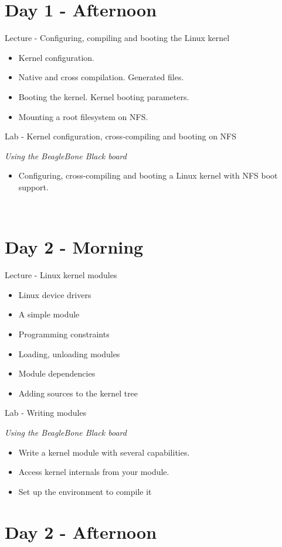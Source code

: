 \documentclass[a4paper,12pt,obeyspaces,spaces,hyphens]{article}
\begin{document}
\section{Day 1 - Afternoon}
\feagendatwocolumn
{Lecture - Configuring, compiling and booting the Linux kernel}
{
  \begin{itemize}
  \item Kernel configuration.
  \item Native and cross compilation. Generated files.
  \item Booting the kernel. Kernel booting parameters.
  \item Mounting a root filesystem on NFS.
  \end{itemize}
}
{Lab - Kernel configuration, cross-compiling and booting on NFS}
{
  {\em Using the BeagleBone Black board}
  \begin{itemize}
  \item Configuring, cross-compiling and booting a Linux kernel with
    NFS boot support.
  \end{itemize}
}
\\
\section{Day 2 - Morning}

\feagendatwocolumn
{Lecture - Linux kernel modules}
{
  \begin{itemize}
  \item Linux device drivers
  \item A simple module
  \item Programming constraints
  \item Loading, unloading modules
  \item Module dependencies
  \item Adding sources to the kernel tree
  \end{itemize}
}
{Lab - Writing modules}
{
  {\em Using the BeagleBone Black board}
  \begin{itemize}
  \item Write a kernel module with several capabilities.
  \item Access kernel internals from your module.
  \item Set up the environment to compile it
  \end{itemize}
}

\section{Day 2 - Afternoon}
\end{document}
